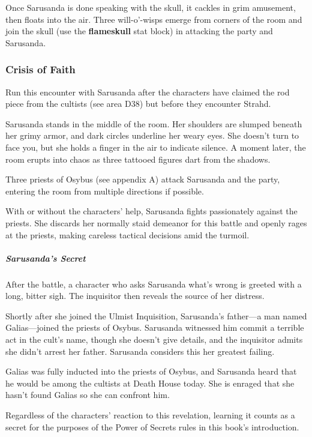 \documentclass[10pt,a4paper,twoside,bg=print,twocolumn,openany,nodeprecatedcode]{dndbook}
\begin{document}
Once Sarusanda is done speaking with the skull, it cackles in grim amusement, then floats into the air. Three will-o'-wisps emerge from corners of the room and join the skull (use the \textbf{flameskull} stat block) in attacking the party and Sarusanda.

\subsubsection{Crisis of Faith}
Run this encounter with Sarusanda after the characters have claimed the rod piece from the cultists (see area D38) but before they encounter Strahd.

\begin{DndReadAloud}{}
Sarusanda stands in the middle of the room. Her shoulders are slumped beneath her grimy armor, and dark circles underline her weary eyes. She doesn't turn to face you, but she holds a finger in the air to indicate silence. A moment later, the room erupts into chaos as three tattooed figures dart from the shadows.

\end{DndReadAloud}

Three priests of Osybus (see appendix A) attack Sarusanda and the party, entering the room from multiple directions if possible.

With or without the characters' help, Sarusanda fights passionately against the priests. She discards her normally staid demeanor for this battle and openly rages at the priests, making careless tactical decisions amid the turmoil.

\subparagraph{Sarusanda's Secret}
After the battle, a character who asks Sarusanda what's wrong is greeted with a long, bitter sigh. The inquisitor then reveals the source of her distress.

Shortly after she joined the Ulmist Inquisition, Sarusanda's father—a man named Galias—joined the priests of Osybus. Sarusanda witnessed him commit a terrible act in the cult's name, though she doesn't give details, and the inquisitor admits she didn't arrest her father. Sarusanda considers this her greatest failing.

Galias was fully inducted into the priests of Osybus, and Sarusanda heard that he would be among the cultists at Death House today. She is enraged that she hasn't found Galias so she can confront him.

Regardless of the characters' reaction to this revelation, learning it counts as a secret for the purposes of the Power of Secrets rules in this book's introduction.
\end{document}

